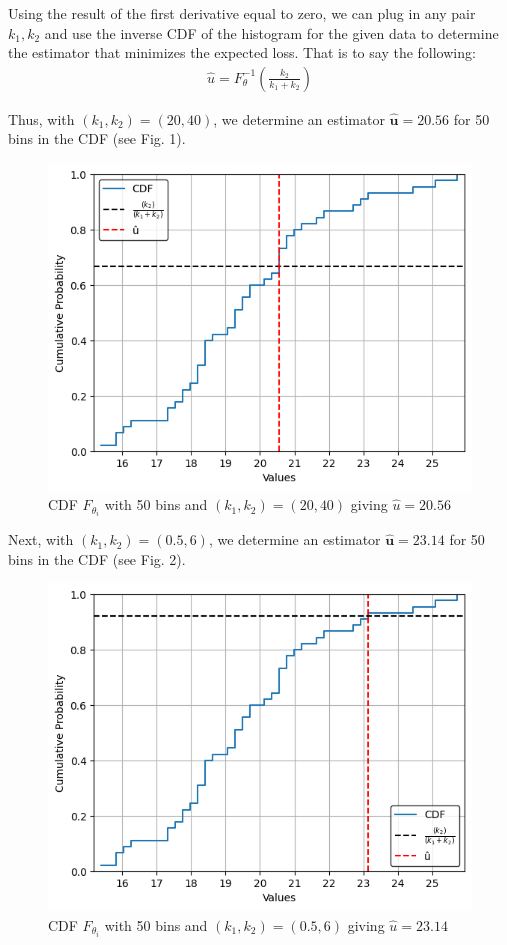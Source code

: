 Using the result of the first derivative equal to zero, we can plug in any pair $k_1, k_2$ and use the inverse CDF of the histogram for the given data to determine the estimator that minimizes the expected loss. That is to say the following:
\begin{align*}
    \hat{u} = F_\theta^{-1}\left(\frac{k_2}{k_1+k_2}\right)
\end{align*}

Thus, with $(k_1, k_2) = (20, 40)$, we determine an estimator $\mathbf{\hat{u}=20.56}$ for 50 bins in the CDF (see Fig. 1).

\begin{figure}
    \centering
    \includegraphics[scale=0.8]{data/05_reporting/problem_set_2/pset2p2.5.1.png}
    \caption{CDF $F_{\theta_i}$ with 50 bins and $(k_1, k_2) = (20, 40)$ giving $\hat{u}=20.56$}
    \label{fig:cdf_2040}
\end{figure}


Next, with $(k_1, k_2) = (0.5, 6)$, we determine an estimator $\mathbf{\hat{u}=23.14}$ for 50 bins in the CDF (see Fig. 2).

\begin{figure}
    \centering
    \includegraphics[scale=0.8]{data/05_reporting/problem_set_2/pset2p2.5.2.png}
    \caption{CDF $F_{\theta_i}$ with 50 bins and $(k_1, k_2) = (0.5, 6)$ giving $\hat{u}=23.14$}
    \label{fig:cdf_056}
\end{figure}
\begin{center}

\end{center}
